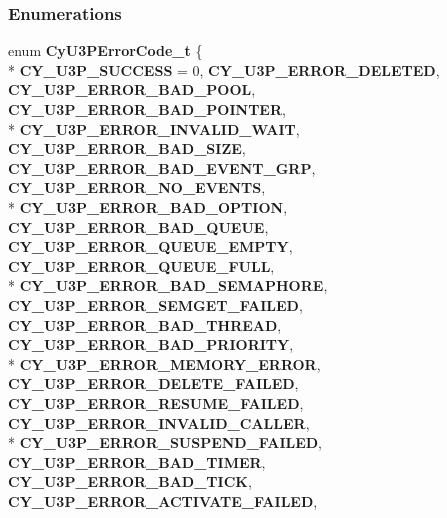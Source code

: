 \subsubsection*{Enumerations}
\begin{DoxyCompactItemize}
\item 
enum {\bf Cy\+U3\+P\+Error\+Code\+\_\+t} \{ \\*
{\bf C\+Y\+\_\+\+U3\+P\+\_\+\+S\+U\+C\+C\+E\+SS} = 0, 
{\bf C\+Y\+\_\+\+U3\+P\+\_\+\+E\+R\+R\+O\+R\+\_\+\+D\+E\+L\+E\+T\+ED}, 
{\bf C\+Y\+\_\+\+U3\+P\+\_\+\+E\+R\+R\+O\+R\+\_\+\+B\+A\+D\+\_\+\+P\+O\+OL}, 
{\bf C\+Y\+\_\+\+U3\+P\+\_\+\+E\+R\+R\+O\+R\+\_\+\+B\+A\+D\+\_\+\+P\+O\+I\+N\+T\+ER}, 
\\*
{\bf C\+Y\+\_\+\+U3\+P\+\_\+\+E\+R\+R\+O\+R\+\_\+\+I\+N\+V\+A\+L\+I\+D\+\_\+\+W\+A\+IT}, 
{\bf C\+Y\+\_\+\+U3\+P\+\_\+\+E\+R\+R\+O\+R\+\_\+\+B\+A\+D\+\_\+\+S\+I\+ZE}, 
{\bf C\+Y\+\_\+\+U3\+P\+\_\+\+E\+R\+R\+O\+R\+\_\+\+B\+A\+D\+\_\+\+E\+V\+E\+N\+T\+\_\+\+G\+RP}, 
{\bf C\+Y\+\_\+\+U3\+P\+\_\+\+E\+R\+R\+O\+R\+\_\+\+N\+O\+\_\+\+E\+V\+E\+N\+TS}, 
\\*
{\bf C\+Y\+\_\+\+U3\+P\+\_\+\+E\+R\+R\+O\+R\+\_\+\+B\+A\+D\+\_\+\+O\+P\+T\+I\+ON}, 
{\bf C\+Y\+\_\+\+U3\+P\+\_\+\+E\+R\+R\+O\+R\+\_\+\+B\+A\+D\+\_\+\+Q\+U\+E\+UE}, 
{\bf C\+Y\+\_\+\+U3\+P\+\_\+\+E\+R\+R\+O\+R\+\_\+\+Q\+U\+E\+U\+E\+\_\+\+E\+M\+P\+TY}, 
{\bf C\+Y\+\_\+\+U3\+P\+\_\+\+E\+R\+R\+O\+R\+\_\+\+Q\+U\+E\+U\+E\+\_\+\+F\+U\+LL}, 
\\*
{\bf C\+Y\+\_\+\+U3\+P\+\_\+\+E\+R\+R\+O\+R\+\_\+\+B\+A\+D\+\_\+\+S\+E\+M\+A\+P\+H\+O\+RE}, 
{\bf C\+Y\+\_\+\+U3\+P\+\_\+\+E\+R\+R\+O\+R\+\_\+\+S\+E\+M\+G\+E\+T\+\_\+\+F\+A\+I\+L\+ED}, 
{\bf C\+Y\+\_\+\+U3\+P\+\_\+\+E\+R\+R\+O\+R\+\_\+\+B\+A\+D\+\_\+\+T\+H\+R\+E\+AD}, 
{\bf C\+Y\+\_\+\+U3\+P\+\_\+\+E\+R\+R\+O\+R\+\_\+\+B\+A\+D\+\_\+\+P\+R\+I\+O\+R\+I\+TY}, 
\\*
{\bf C\+Y\+\_\+\+U3\+P\+\_\+\+E\+R\+R\+O\+R\+\_\+\+M\+E\+M\+O\+R\+Y\+\_\+\+E\+R\+R\+OR}, 
{\bf C\+Y\+\_\+\+U3\+P\+\_\+\+E\+R\+R\+O\+R\+\_\+\+D\+E\+L\+E\+T\+E\+\_\+\+F\+A\+I\+L\+ED}, 
{\bf C\+Y\+\_\+\+U3\+P\+\_\+\+E\+R\+R\+O\+R\+\_\+\+R\+E\+S\+U\+M\+E\+\_\+\+F\+A\+I\+L\+ED}, 
{\bf C\+Y\+\_\+\+U3\+P\+\_\+\+E\+R\+R\+O\+R\+\_\+\+I\+N\+V\+A\+L\+I\+D\+\_\+\+C\+A\+L\+L\+ER}, 
\\*
{\bf C\+Y\+\_\+\+U3\+P\+\_\+\+E\+R\+R\+O\+R\+\_\+\+S\+U\+S\+P\+E\+N\+D\+\_\+\+F\+A\+I\+L\+ED}, 
{\bf C\+Y\+\_\+\+U3\+P\+\_\+\+E\+R\+R\+O\+R\+\_\+\+B\+A\+D\+\_\+\+T\+I\+M\+ER}, 
{\bf C\+Y\+\_\+\+U3\+P\+\_\+\+E\+R\+R\+O\+R\+\_\+\+B\+A\+D\+\_\+\+T\+I\+CK}, 
{\bf C\+Y\+\_\+\+U3\+P\+\_\+\+E\+R\+R\+O\+R\+\_\+\+A\+C\+T\+I\+V\+A\+T\+E\+\_\+\+F\+A\+I\+L\+ED}, 

\end{DoxyCompactItemize}
